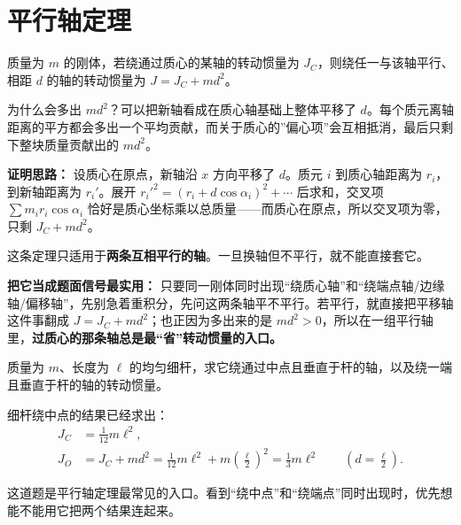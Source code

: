 \documentclass[lang=cn,11pt]{elegantbook}
\begin{document}
\section{平行轴定理}

\begin{theorem}[平行轴定理]\label{thm:parallel-axis}
质量为 \(m\) 的刚体，若绕通过质心的某轴的转动惯量为 \(J_C\)，则绕任一与该轴平行、相距 \(d\) 的轴的转动惯量为 \(J=J_C+md^2\)。
\end{theorem}

\begin{note}
为什么会多出 \(md^2\)？可以把新轴看成在质心轴基础上整体平移了 \(d\)。每个质元离轴距离的平方都会多出一个平均贡献，而关于质心的”偏心项”会互相抵消，最后只剩下整块质量贡献出的 \(md^2\)。

\textbf{证明思路：} 设质心在原点，新轴沿 \(x\) 方向平移了 \(d\)。质元 \(i\) 到质心轴距离为 \(r_i\)，到新轴距离为 \(r_i'\)。展开 \(r_i'^2=(r_i+d\cos\alpha_i)^2+\cdots\) 后求和，交叉项 \(\sum m_i r_i\cos\alpha_i\) 恰好是质心坐标乘以总质量——而质心在原点，所以交叉项为零，只剩 \(J_C+md^2\)。
\end{note}

\begin{remark}
这条定理只适用于\textbf{两条互相平行的轴}。一旦换轴但不平行，就不能直接套它。
\end{remark}

\begin{note}
\textbf{把它当成题面信号最实用：} 只要同一刚体同时出现“绕质心轴”和“绕端点轴/边缘轴/偏移轴”，先别急着重积分，先问这两条轴平不平行。若平行，就直接把平移轴这件事翻成 \(J=J_C+md^2\)；也正因为多出来的是 \(md^2>0\)，所以在一组平行轴里，\textbf{过质心的那条轴总是最“省”转动惯量的入口。}
\end{note}

\begin{example}[细杆绕端点的转动惯量]
质量为 \(m\)、长度为 \(\ell\) 的均匀细杆，求它绕通过中点且垂直于杆的轴，以及绕一端且垂直于杆的轴的转动惯量。
\end{example}

\begin{solution}
细杆绕中点的结果已经求出：
\[
\begin{aligned}
J_C&=\frac{1}{12}m\ell^2,\\
J_O&=J_C+md^2
=\frac{1}{12}m\ell^2+m\left(\frac{\ell}{2}\right)^2
=\frac13 m\ell^2
\qquad \left(d=\frac{\ell}{2}\right).
\end{aligned}
\]

这道题是平行轴定理最常见的入口。看到“绕中点”和“绕端点”同时出现时，优先想能不能用它把两个结果连起来。
\end{solution}
\end{document}
